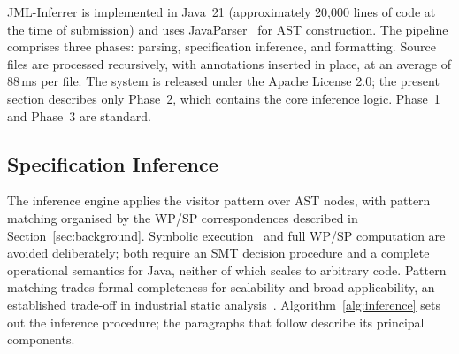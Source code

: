 \documentclass[11pt]{article}
\begin{document}
JML-Inferrer is implemented in Java~21 (approximately 20{,}000 lines of code at the time of submission) and uses JavaParser~\cite{javaparser} for AST construction. The pipeline comprises three phases: parsing, specification inference, and formatting. Source files are processed recursively, with annotations inserted in place, at an average of 88\,ms per file. The system is released under the Apache License 2.0; the present section describes only Phase~2, which contains the core inference logic. Phase~1 and Phase~3 are standard.

\subsection{Specification Inference}

The inference engine applies the visitor pattern over AST nodes, with pattern matching organised by the WP/SP correspondences described in Section~\ref{sec:background}. Symbolic execution~\cite{king1976symbolic, cadar2008klee} and full WP/SP computation are avoided deliberately; both require an SMT decision procedure and a complete operational semantics for Java, neither of which scales to arbitrary code. Pattern matching trades formal completeness for scalability and broad applicability, an established trade-off in industrial static analysis~\cite{calcagno2015infer}. Algorithm~\ref{alg:inference} sets out the inference procedure; the paragraphs that follow describe its principal components.
\end{document}
